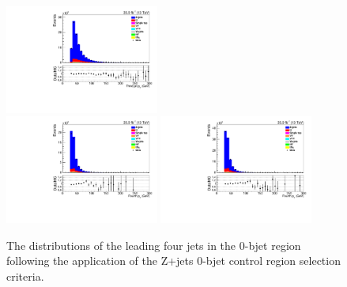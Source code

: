 \begin{figure}[!ht]
\includegraphics[width=0.45\textwidth]{figs/background-estimation/plots/unblinded/DY_control_old_prompt_mumu_DYamcatnlo/thirdJetPt_SingleTop_jetSel_mumu.pdf}
\\
\includegraphics[width=0.45\textwidth]{figs/background-estimation/plots/unblinded/DY_control_old_prompt_ee_DYamcatnlo/fourthJetPt_SingleTop_jetSel_ee.pdf}
\includegraphics[width=0.45\textwidth]{figs/background-estimation/plots/unblinded/DY_control_old_prompt_mumu_DYamcatnlo/fourthJetPt_SingleTop_jetSel_mumu.pdf}
\caption{
The distributions of the leading four jets \pt in the 0-bjet region following the application of the Z+jets 0-bjet control region selection criteria.
}
\label{fig:CR_NLO_jetPt_jetSel}
\end{figure}

